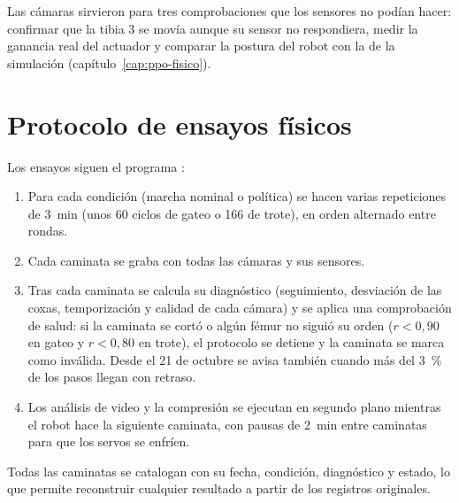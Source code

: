 Las cámaras sirvieron para tres comprobaciones que los sensores no podían hacer:
confirmar que la tibia 3 se movía aunque su sensor no respondiera, medir la
ganancia real del actuador y comparar la postura del robot con la de la
simulación (capítulo~\ref{cap:ppo-fisico}).

\section{Protocolo de ensayos físicos}
\label{sec:protocolo-fisico}

Los ensayos siguen el programa :
\begin{enumerate}
    \item Para cada condición (marcha nominal o política) se hacen varias
    repeticiones de 3~min (unos 60 ciclos de gateo o 166 de trote), en orden
    alternado entre rondas.
    \item Cada caminata se graba con todas las cámaras y sus sensores.
    \item Tras cada caminata se calcula su diagnóstico (seguimiento, desviación
    de las coxas, temporización y calidad de cada cámara) y se aplica una
    comprobación de salud: si la caminata se cortó o algún fémur no siguió su
    orden ($r<0{,}90$ en gateo y $r<0{,}80$ en trote), el protocolo se detiene y
    la caminata se marca como inválida. Desde el 21 de octubre se avisa también
    cuando más del 3~\% de los pasos llegan con retraso.
    \item Los análisis de video y la compresión se ejecutan en segundo plano
    mientras el robot hace la siguiente caminata, con pausas de 2~min entre
    caminatas para que los servos se enfríen.
\end{enumerate}
Todas las caminatas se catalogan con su fecha, condición, diagnóstico y estado,
lo que permite reconstruir cualquier resultado a partir de los registros
originales.
